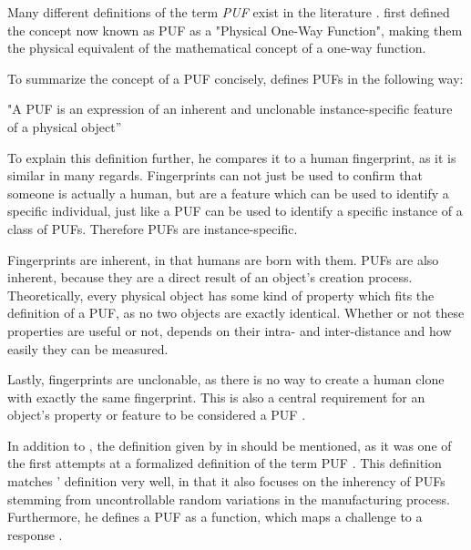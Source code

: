 Many different definitions of the term \emph{PUF} exist in the literature \cite{Ruehrmair2010} \cite{Guajardo} \cite{Maes2013}.
\citeauthor*{Pappu2002} first defined the concept now known as PUF as a "Physical One-Way Function",
making them the physical equivalent of the mathematical concept of a one-way function. \cite{Pappu2002}

To summarize the concept of a PUF concisely, \citeauthor*{Maes2013} defines \acp{PUF} in the following way:

"A PUF is an expression of an inherent and unclonable instance-specific feature of a physical object” \cite[][p. 12]{Maes2013}

To explain this definition further, he compares it to a human fingerprint, as it is similar in many regards.
Fingerprints can not just be used to confirm that someone is actually a human,
but are a feature which can be used to identify a specific individual, just like
a \ac{PUF} can be used to identify a specific instance of a class of \acp{PUF}.
Therefore PUFs are instance-specific. \cite[][p. 11f]{Maes2013}

Fingerprints are inherent, in that humans are born with them.
PUFs are also inherent, because they are a direct result of an object's creation process.
Theoretically, every physical object has some kind of property which fits the definition of a PUF,
as no two objects are exactly identical. Whether or not these properties are useful or not,
depends on their intra- and inter-distance and how easily they can be measured. \cite[][p. 12]{Maes2013}

Lastly, fingerprints are unclonable, as there is no way to create a human clone with exactly the same fingerprint.
This is also a central requirement for an object's property or feature to be considered a PUF .\cite[][p. 12]{Maes2013}

In addition to \citeauthor{Maes2013}, the definition given by \citeauthor*{Guajardo} in \cite{Guajardo} should be mentioned,
as it was one of the first attempts at a formalized definition of the term PUF \cite[][p. 84f]{Ruehrmair2010}.
This definition matches \citeauthor{Maes2013}' definition very well, in that it also focuses on the inherency of PUFs stemming
from uncontrollable random variations in the manufacturing process.
Furthermore, he defines a PUF as a function, which maps a challenge to a response .\cite[][p. 65f]{Guajardo}

